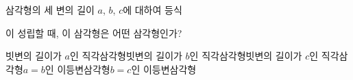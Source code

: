 삼각형의 세 변의 길이 $a$, $b$, $c$에 대하여 등식\par\smallskip{}\par\smallskip\noindent 이 성립할 때, 이 삼각형은 어떤 삼각형인가?
\begin{choicesv}{빗변의 길이가 $a$인 직각삼각형}{빗변의 길이가 $b$인 직각삼각형}{빗변의 길이가 $c$인 직각삼각형}{$a=b$인 이등변삼각형}{$b=c$인 이등변삼각형}\end{choicesv}
